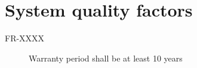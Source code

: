  \section{System quality factors}
 \begin{description}
 \item[FR-XXXX]Warranty period shall be at least 10 years
 \end{description}